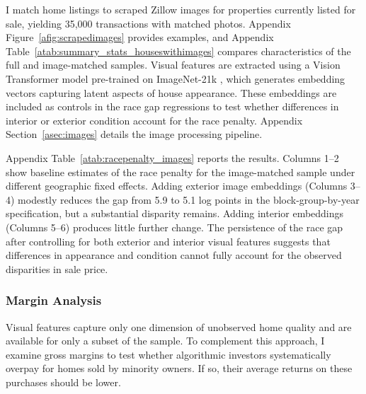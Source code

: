\documentclass[11pt]{article}
\begin{document}
I match home listings to scraped Zillow images for properties currently listed for sale, yielding 35,000 transactions with matched photos. Appendix Figure~\ref{afig:scrapedimages} provides examples, and Appendix Table~\ref{atab:summary_stats_houseswithimages} compares characteristics of the full and image-matched samples. Visual features are extracted using a Vision Transformer model pre-trained on ImageNet-21k \citep{dosovitskiy2020, rw2019timm}, which generates embedding vectors capturing latent aspects of house appearance. These embeddings are included as controls in the race gap regressions to test whether differences in interior or exterior condition account for the race penalty. Appendix Section~\ref{asec:images} details the image processing pipeline.

Appendix Table~\ref{atab:racepenalty_images} reports the results. Columns 1–2 show baseline estimates of the race penalty for the image-matched sample under different geographic fixed effects. Adding exterior image embeddings (Columns 3--4) modestly reduces the gap from 5.9 to 5.1 log points in the block-group-by-year specification, but a substantial disparity remains. Adding interior embeddings (Columns 5--6) produces little further change. The persistence of the race gap after controlling for both exterior and interior visual features suggests that differences in appearance and condition cannot fully account for the observed disparities in sale price.





\subsubsection{Margin Analysis} \label{sec:margin_analysis}

Visual features capture only one dimension of unobserved home quality and are available for only a subset of the sample. To complement this approach, I examine gross margins to test whether algorithmic investors systematically overpay for homes sold by minority owners. If so, their average returns on these purchases should be lower.
\end{document}

